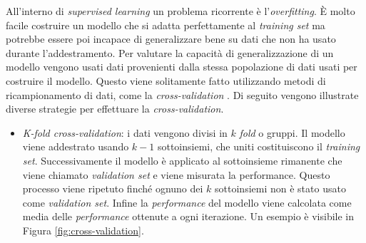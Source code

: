 \documentclass[12pt,italian]{report}
\begin{document}
	All'interno di \textit{supervised learning} un problema ricorrente è l'\textit{overfitting}. È molto facile costruire un modello che si adatta perfettamente al \textit{training set} ma potrebbe essere poi incapace di generalizzare bene su dati che non ha usato durante l'addestramento.
	Per valutare la capacità di generalizzazione di un modello vengono usati dati provenienti dalla stessa popolazione di dati usati per costruire il modello. Questo viene solitamente fatto utilizzando metodi di ricampionamento di dati, come la \textit{cross-validation} \cite{berrar2019cross}.
	Di seguito vengono illustrate diverse strategie per effettuare la \textit{cross-validation}.
	\begin{itemize}
		\item \textit{K-fold cross-validation}: i dati vengono divisi in $k$ \textit{fold} o gruppi. Il modello viene addestrato usando $k-1$ sottoinsiemi, che uniti costituiscono il \textit{training set}. Successivamente il modello è applicato al sottoinsieme rimanente che viene chiamato \textit{validation set} e viene misurata la performance.
		Questo processo viene ripetuto finché ognuno dei $k$ sottoinsiemi non è stato usato come \textit{validation set}. Infine la \textit{performance} del modello viene calcolata come media delle \textit{performance} ottenute a ogni iterazione. Un esempio è visibile in Figura \ref{fig:cross-validation}.	
		

\end{itemize}
\end{document}
